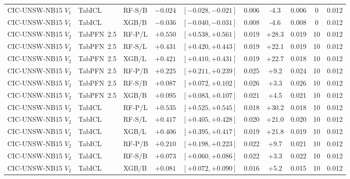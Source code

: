 \begin{tabular}{@{}lllrcccccc@{}}
CIC-UNSW-NB15 $V_1$ & TabICL & RF-S/B & $-0.024$ & $[-0.028,-0.021]$ & 0.006 & -4.3 & 0.006 & 0 & 0.012 \\
CIC-UNSW-NB15 $V_1$ & TabICL & XGB/B & $-0.036$ & $[-0.040,-0.031]$ & 0.008 & -4.6 & 0.008 & 0 & 0.012 \\
CIC-UNSW-NB15 $V_2$ & TabPFN~2.5 & RF-P/L & $+0.550$ & $[+0.538,+0.561]$ & 0.019 & +28.3 & 0.019 & 10 & 0.012 \\
CIC-UNSW-NB15 $V_2$ & TabPFN~2.5 & RF-S/L & $+0.431$ & $[+0.420,+0.443]$ & 0.019 & +22.1 & 0.019 & 10 & 0.012 \\
CIC-UNSW-NB15 $V_2$ & TabPFN~2.5 & XGB/L & $+0.421$ & $[+0.410,+0.431]$ & 0.019 & +22.7 & 0.018 & 10 & 0.012 \\
CIC-UNSW-NB15 $V_2$ & TabPFN~2.5 & RF-P/B & $+0.225$ & $[+0.211,+0.239]$ & 0.025 & +9.2 & 0.024 & 10 & 0.012 \\
CIC-UNSW-NB15 $V_2$ & TabPFN~2.5 & RF-S/B & $+0.087$ & $[+0.072,+0.102]$ & 0.026 & +3.3 & 0.026 & 10 & 0.012 \\
CIC-UNSW-NB15 $V_2$ & TabPFN~2.5 & XGB/B & $+0.095$ & $[+0.083,+0.107]$ & 0.021 & +4.5 & 0.021 & 10 & 0.012 \\
CIC-UNSW-NB15 $V_2$ & TabICL & RF-P/L & $+0.535$ & $[+0.525,+0.545]$ & 0.018 & +30.2 & 0.018 & 10 & 0.012 \\
CIC-UNSW-NB15 $V_2$ & TabICL & RF-S/L & $+0.417$ & $[+0.405,+0.428]$ & 0.020 & +21.0 & 0.020 & 10 & 0.012 \\
CIC-UNSW-NB15 $V_2$ & TabICL & XGB/L & $+0.406$ & $[+0.395,+0.417]$ & 0.019 & +21.8 & 0.019 & 10 & 0.012 \\
CIC-UNSW-NB15 $V_2$ & TabICL & RF-P/B & $+0.210$ & $[+0.198,+0.223]$ & 0.022 & +9.7 & 0.021 & 10 & 0.012 \\
CIC-UNSW-NB15 $V_2$ & TabICL & RF-S/B & $+0.073$ & $[+0.060,+0.086]$ & 0.022 & +3.3 & 0.022 & 10 & 0.012 \\
CIC-UNSW-NB15 $V_2$ & TabICL & XGB/B & $+0.081$ & $[+0.072,+0.090]$ & 0.016 & +5.2 & 0.015 & 10 & 0.012 \\
\bottomrule
\end{tabular}
